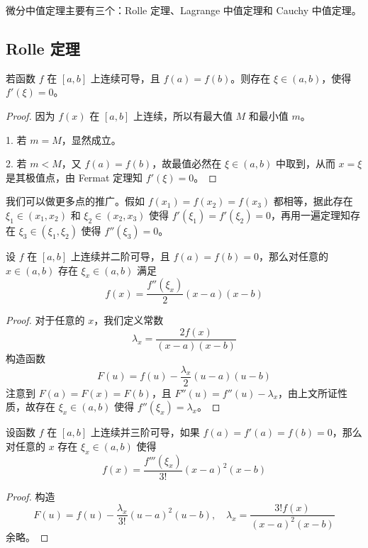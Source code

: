 微分中值定理主要有三个：Rolle 定理、Lagrange 中值定理和 Cauchy 中值定理。

\subsection{Rolle 定理}

\begin{theorem}
	若函数 $f$ 在 $[a,b]$ 上连续可导，且 $f(a)=f(b)$。则存在 $\xi\in(a,b)$，使得 $f'(\xi)=0$。
\end{theorem}

\begin{proof}
	因为 $f(x)$ 在 $[a,b]$ 上连续，所以有最大值 $M$ 和最小值 $m$。

	1. 若 $m=M$，显然成立。

	2. 若 $m < M$，又 $f(a) = f(b)$，故最值必然在 $\xi \in (a, b)$ 中取到，从而 $x=\xi$ 是其极值点，由 Fermat 定理知 $f'(\xi) = 0$。
\end{proof}

我们可以做更多点的推广。假如 $f(x_1) = f(x_2) = f(x_3)$ 都相等，据此存在 $\xi_1 \in (x_1, x_2)$ 和 $\xi_2 \in (x_2, x_3)$ 使得 $f'(\xi_1) = f'(\xi_2) = 0$，再用一遍定理知存在 $\xi_3 \in (\xi_1, \xi_2)$ 使得 $f''(\xi_3) = 0$。

\begin{example}
	设 $f$ 在 $[a,b]$ 上连续并二阶可导，且 $f(a) = f(b) = 0$，那么对任意的 $x \in (a, b)$ 存在 $\xi_x \in (a,b)$ 满足
	\[ f(x) = \frac{f''(\xi_x)}{2}(x-a)(x-b) \]
\end{example}

\begin{proof}
	对于任意的 $x$，我们定义常数
	\[ \lambda_x = \frac{2 f(x)}{(x - a)(x - b)} \]
	构造函数
	\[ F(u) = f(u) - \frac{\lambda_x}{2} (u-a)(u-b) \]
	注意到 $F(a) = F(x) = F(b)$，且 $F''(u) = f''(u) - \lambda_x$，由上文所证性质，故存在 $\xi_x \in (a, b)$ 使得 $f''(\xi_x) = \lambda_x$。
\end{proof}

\begin{example}
	设函数 $f$ 在 $[a,b]$ 上连续并三阶可导，如果 $f(a) = f'(a) = f(b) = 0$，那么对任意的 $x$ 存在 $\xi_x \in (a, b)$ 使得
	\[ f(x) = \frac{f'''(\xi_x)}{3!} (x-a)^2(x-b) \]
\end{example}

\begin{proof}
	构造
	\[ F(u) = f(u) - \frac{\lambda_x}{3!}(u-a)^2(u-b), \quad \lambda_x = \frac{3! f(x)}{(x-a)^2(x-b)} \]
	余略。
\end{proof}


